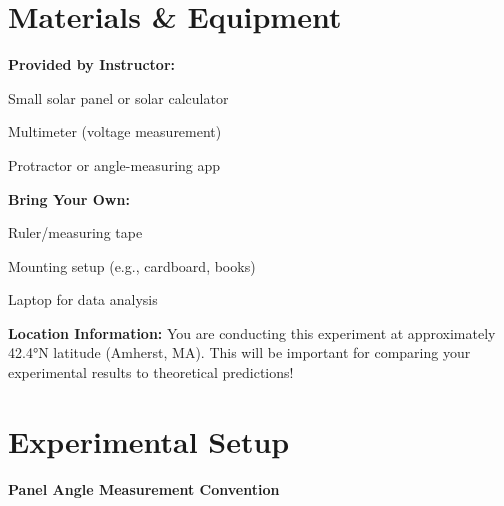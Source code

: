 \documentclass[11pt,twoside]{article}
\numberwithin{equation}{section}
\newcommand{\?}{\stackrel{?}{=}}
\begin{document}
\section{Materials \& Equipment}

\begin{minipage}[t]{0.48\textwidth}
\textbf{Provided by Instructor:}
\begin{compactitem}
    \item Small solar panel or solar calculator
    \item Multimeter (voltage measurement)
    \item   Protractor or angle-measuring app
\end{compactitem}
\end{minipage}
\hfill
\begin{minipage}[t]{0.48\textwidth}
\textbf{Bring Your Own:}
\begin{compactitem}
    \item Ruler/measuring tape
    \item Mounting setup (e.g., cardboard, books)
    \item Laptop for data analysis
\end{compactitem}
\end{minipage}

\vspace{0.3cm}

\begin{successbox}
\textbf{Location Information:} You are conducting this experiment at approximately 42.4°N latitude (Amherst, MA). This will be important for comparing your experimental results to theoretical predictions!
\end{successbox}

\section{Experimental Setup}

\begin{center}
\textbf{Panel Angle Measurement Convention}\\[0.3cm]
\end{center}
\end{document}

